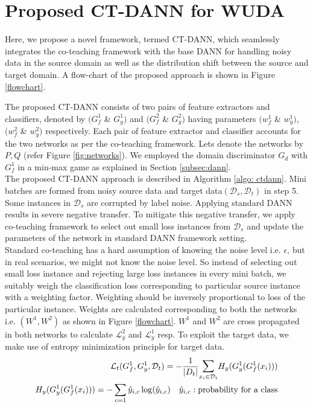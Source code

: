 
\section{Proposed CT-DANN for WUDA}
Here, we propose a novel framework, termed CT-DANN, which seamlessly integrates the co-teaching framework with the base DANN for handling noisy data in the source domain as well as the distribution shift between the source and target domain.
A flow-chart of the proposed approach is shown in Figure \ref{flowchart}.

\vspace{-1cm}


The proposed CT-DANN consists of two pairs of feature extractors and classifiers, denoted by $(G_{f}^1$ \& $G_{y}^1)$ and $(G_{f}^2$ \& $G_{y}^2)$ having parameters $(w_{f}^1$ \& $w_{y}^1)$, $(w_{f}^2$ \& $w_{y}^2)$ respectively. 
Each pair of feature extractor and classifier accounts for the two networks as per the co-teaching framework. Lets denote the networks by $P, Q$ (refer Figure \ref{fig:networks}). We employed the domain discriminator $G_d$ with $G_{f}^1$ in a min-max game as explained in Section \ref{subsec:dann}.\\

The proposed CT-DANN approach is described in Algorithm \ref{algo: ctdann}.
Mini batches are formed from noisy source data and target data$(\mathcal{D}_s, \mathcal{D}_t)$ in step 5.
Some instances in $\mathcal{D}_s$ are corrupted by label noise. Applying standard DANN results in severe negative transfer. To mitigate this negative transfer, we apply co-teaching framework to select out small loss instances from $\mathcal{D}_s$ and update the parameters of the network in standard DANN framework setting.\\

Standard co-teaching has a hard assumption of knowing the noise level i.e. $\epsilon$, but in real scenarios, we might not know the noise level. So instead of selecting out small loss instance and rejecting large loss instances in every mini batch, we suitably weigh the classification loss corresponding to particular source instance with a weighting factor. Weighting should be inversely proportional to loss of the particular instance. Weights are calculated corresponding to both the networks i.e. $(W^1, W^2)$ as shown in Figure \ref{flowchart}. $W^1$ and $W^2$ are cross propagated in both networks to calculate $\mathcal{L}_{y}^2$ and $\mathcal{L}_{y}^1$ resp. To exploit the target data, we make use of entropy minimization principle for target data.
\begin{equation}
\begin{align}
    \mathcal{L}_t(G_{f}^1, G_{y}^1, \mathcal{D}_t) = - \dfrac{1}{|D_t|} \mathlarger\sum\limits_{x_i \in \mathcal{D}_t} H_y(G_{y}^1(G_{f}^1(x_i)))\\
    H_y(G_{y}^1(G_{f}^1(x_i))) = - \sum_{c=1} \hat{y}_{i,c} \log(\hat{y}_{i,c}) \quad  \hat{y}_{i,c}: \text{probability for a class}
\end{align}
\end{equation}

